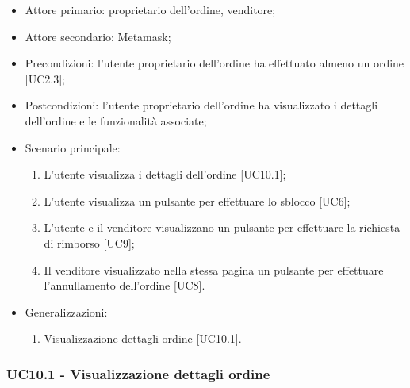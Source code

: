 \begin{itemize}
    \item Attore primario: proprietario dell'ordine, venditore;
    \item Attore secondario: Metamask\glo{};
    \item Precondizioni: l'utente proprietario dell'ordine ha effettuato almeno un ordine [UC2.3];
    \item Postcondizioni: l'utente proprietario dell'ordine ha visualizzato i dettagli dell'ordine e le funzionalità associate;
    \item Scenario principale:
          \begin{enumerate}
              \item L'utente visualizza i dettagli dell'ordine [UC10.1];
              \item L'utente visualizza un pulsante per effettuare lo sblocco [UC6];
              \item L'utente e il venditore visualizzano un pulsante per effettuare la richiesta di rimborso [UC9];
              \item Il venditore visualizzato nella stessa pagina un pulsante per effettuare l'annullamento dell'ordine [UC8].
          \end{enumerate}
    \item Generalizzazioni:
          \begin{enumerate}
              \item Visualizzazione dettagli ordine [UC10.1].
          \end{enumerate}
\end{itemize}

\subsubsection{UC10.1 - Visualizzazione dettagli ordine}

